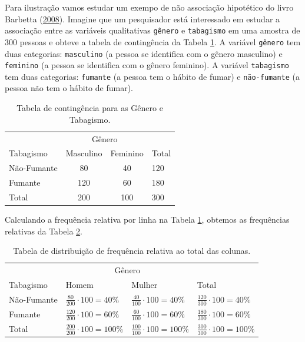 \documentclass[]{article}
\begin{document}
Para ilustração vamos estudar um exempo de não associação hipotético do livro Barbetta (\protect\hyperlink{ref-barbetta2008estatistica}{2008}). Imagine que um pesquisador está interessado em estudar a associação entre as variáveis qualitativas \texttt{gênero} e \texttt{tabagismo} em uma amostra de \(300\) pessoas e obteve a tabela de contingência da Tabela \ref{tab:naoAssociacao}. A variável \texttt{gênero} tem duas categorias: \texttt{masculino} (a pessoa se identifica com o gênero masculino) e \texttt{feminino} (a pessoa se identifica com o gênero feminino). A variável \texttt{tabagismo} tem duas categorias: \texttt{fumante} (a pessoa tem o hábito de fumar) e \texttt{não-fumante} (a pessoa não tem o hábito de fumar).

\begin{table}[htbp]
\centering
\caption{Tabela de contingência para as Gênero e Tabagismo.}
\label{tab:naoAssociacao}
\begin{tabular}{l|cc|l}
& \multicolumn{2}{|c|}{Gênero} & \\ \cline{2-3}
Tabagismo & Masculino & Feminino & Total\\ \hline
Não-Fumante & 80 & 40 & 120\\
Fumante & 120 & 60 & 180\\ \hline
Total & 200 & 100 & 300\\
\end{tabular}
\end{table}

Calculando a frequência relativa por linha na Tabela \ref{tab:naoAssociacao}, obtemos as frequências relativas da Tabela \ref{tab:naoAssociacaoRel}.

\begin{table}[htbp]
\centering
\caption{Tabela de distribuição de frequência relativa ao total das colunas.}
\label{tab:naoAssociacaoRel}
\begin{tabular}{l|ll|l}
& \multicolumn{2}{|c|}{Gênero} & \\ \cline{2-3}
Tabagismo & Homem & Mulher & Total\\ \hline
Não-Fumante & {\color{brown} $\frac{80}{200}\cdot 100 = 40\%$} &  {\color{blue}$\frac{40}{100}\cdot 100 = 40\%$} & {\color{red}$\frac{120}{300}\cdot 100= 40\%$} \\
Fumante & $\frac{120}{200}\cdot 100 = 60\%$  &  $\frac{60}{100}\cdot 100= 60\%$ &  $\frac{180}{300}\cdot 100=60\%$ \\ \hline
Total & $\frac{200}{200}\cdot 100= 100\%$ &  $\frac{100}{100}\cdot 100 = 100\%$  & $\frac{300}{300}\cdot 100= 100\%$ \\ 
\end{tabular}
\end{table}
\end{document}
